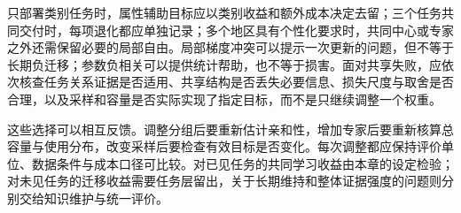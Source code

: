 只部署类别任务时，属性辅助目标应以类别收益和额外成本决定去留；三个任务共同交付时，每项退化都应单独记录；多个地区具有个性化要求时，共同中心或专家之外还需保留必要的局部自由。局部梯度冲突可以提示一次更新的问题，但不等于长期负迁移；参数负相关可以提供统计帮助，也不等于损害。面对共享失败，应依次核查任务关系证据是否适用、共享结构是否丢失必要信息、损失尺度与取舍是否合理，以及采样和容量是否实际实现了指定目标，而不是只继续调整一个权重。

这些选择可以相互反馈。调整分组后要重新估计亲和性，增加专家后要重新核算总容量与使用分布，改变采样后要检查有效目标是否变化。每次调整都应保持评价单位、数据条件与成本口径可比较。对已见任务的共同学习收益由本章的设定检验；对未见任务的迁移收益需要任务层留出，关于长期维持和整体证据强度的问题则分别交给知识维护与统一评价。
